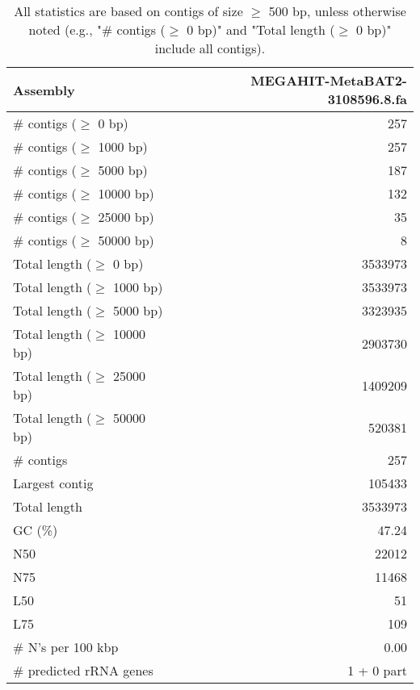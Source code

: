 \documentclass[12pt,a4paper]{article}
\begin{document}
\begin{table}[ht]
\begin{center}
\caption{All statistics are based on contigs of size $\geq$ 500 bp, unless otherwise noted (e.g., "\# contigs ($\geq$ 0 bp)" and "Total length ($\geq$ 0 bp)" include all contigs).}
\begin{tabular}{|l*{1}{|r}|}
\hline
Assembly & MEGAHIT-MetaBAT2-3108596.8.fa \\ \hline
\# contigs ($\geq$ 0 bp) & 257 \\ \hline
\# contigs ($\geq$ 1000 bp) & 257 \\ \hline
\# contigs ($\geq$ 5000 bp) & 187 \\ \hline
\# contigs ($\geq$ 10000 bp) & 132 \\ \hline
\# contigs ($\geq$ 25000 bp) & 35 \\ \hline
\# contigs ($\geq$ 50000 bp) & 8 \\ \hline
Total length ($\geq$ 0 bp) & 3533973 \\ \hline
Total length ($\geq$ 1000 bp) & 3533973 \\ \hline
Total length ($\geq$ 5000 bp) & 3323935 \\ \hline
Total length ($\geq$ 10000 bp) & 2903730 \\ \hline
Total length ($\geq$ 25000 bp) & 1409209 \\ \hline
Total length ($\geq$ 50000 bp) & 520381 \\ \hline
\# contigs & 257 \\ \hline
Largest contig & 105433 \\ \hline
Total length & 3533973 \\ \hline
GC (\%) & 47.24 \\ \hline
N50 & 22012 \\ \hline
N75 & 11468 \\ \hline
L50 & 51 \\ \hline
L75 & 109 \\ \hline
\# N's per 100 kbp & 0.00 \\ \hline
\# predicted rRNA genes & 1 + 0 part \\ \hline
\end{tabular}
\end{center}
\end{table}
\end{document}
